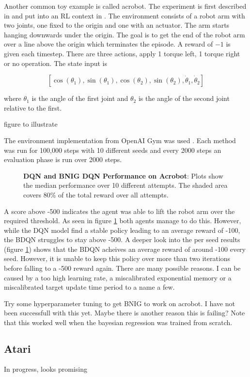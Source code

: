 Another common toy example is called acrobot. The experiment is first described in \cite{hauser_1990} and put into an RL context in \cite{sutton_1996}. The environment consists of a robot arm with two joints, one fixed to the origin and one with an actuator. The arm starts hanging downwards under the origin. The goal is to get the end of the robot arm over a line above the origin which terminates the episode. A reward of $-1$ is given each timestep. There are three actions, apply 1 torque left, 1 torque right or no operation. The state input is

$$
[\cos(\theta_1), \sin(\theta_1), \cos(\theta_2), \sin(\theta_2), \dot{\theta}_1, \dot{\theta}_2]
$$

where $\theta_1$ is the angle of the first joint and $\theta_2$ is the angle of the second joint relative to the first.

\todo figure to illustrate 

The environment implementation from OpenAI Gym was used \citep{OpenAI_gym}. Each method was run for 100,000 steps with 10 different seeds and every 2000 steps an evaluation phase is run over 2000 steps. 

\begin{figure}[H]
    \centering
    \caption{\textbf{DQN and BNIG DQN Performance on Acrobot}: Plots show the median performance over 10 different attempts. The shaded area covers 80\% of the total reward over all attempts.}
    \label{fig:nn_acrobot}
\end{figure}

A score above -500 indicates the agent was able to lift the robot arm over the required threshold. As seen in figure \ref{fig:nn_acrobot} both agents manage to do this. However, while the DQN model find a stable policy leading to an average reward of -100, the BDQN struggles to stay above -500. A deeper look into the per seed results (figure \ref{fig:nn_acrobot}) shows that the BDQN acheives an average reward of around -100 every seed. However, it is unable to keep this policy over more than two iterations before falling to a -500 reward again. There are many possible reasons. I can be caused by a too high learning rate, a miscalibrated exponential memory or a miscalibrated target update time period to a name a few.

\todo Try some hyperparameter tuning to get BNIG to work on acrobot. I have not been successfull with this yet. Maybe there is another reason this is failing? Note that this worked well when the bayesian regression was trained from scratch.

\subsection{Atari}

\todo In progress, looks promising

\cleardoublepage